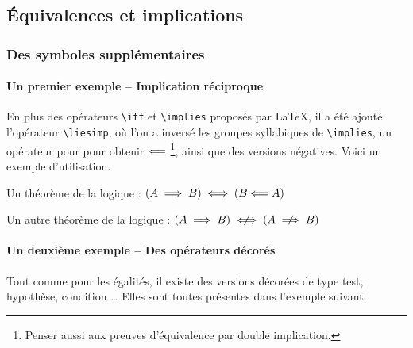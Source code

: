 \documentclass[12pt,a4paper]{article}
\begin{document}

\subsection{Équivalences et implications}

\subsubsection{Des symboles supplémentaires}

\paragraph{Un premier exemple -- Implication réciproque}

En plus des opérateurs \verb+\iff+ et \verb+\implies+ proposés par \LaTeX{}, il a été ajouté l'opérateur \verb+\liesimp+, où l'on a inversé les groupes syllabiques de \verb+\implies+, un opérateur pour pour obtenir $\mathrel{\Longleftarrow}$
\footnote{
	Penser aussi aux preuves d'équivalence par double implication.
},
ainsi que des versions négatives. Voici un exemple d'utilisation.

\begin{tcblisting}{}
Un théorème de la logique : $(A \implies B) \iff (B \liesimp A)$

Un autre théorème de la logique : $(A \implies B) \notiff (A \notimplies B)$
\end{tcblisting}



\paragraph{Un deuxième exemple -- Des opérateurs décorés}

Tout comme pour les égalités, il existe des versions décorées de type test, hypothèse, condition \dots{} 
Elles sont toutes présentes dans l'exemple suivant.

\end{document}

